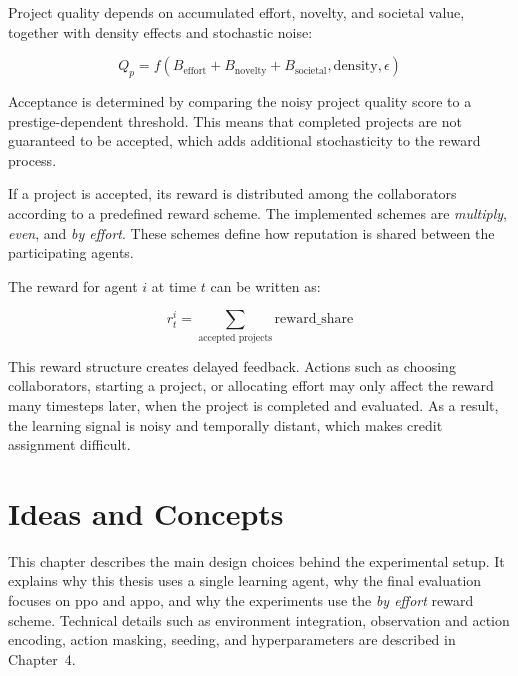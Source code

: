 \documentclass[english,bachelor]{hsluthesis}
\begin{document}
Project quality depends on accumulated effort, novelty, and societal value, together with density effects and stochastic noise:

\begin{equation}
Q_p = f(B_{\text{effort}} + B_{\text{novelty}} + B_{\text{societal}}, \text{density}, \epsilon)
\end{equation}

Acceptance is determined by comparing the noisy project quality score to a prestige-dependent threshold. This means that completed projects are not guaranteed to be accepted, which adds additional stochasticity to the reward process.

If a project is accepted, its reward is distributed among the collaborators according to a predefined reward scheme. The implemented schemes are \textit{multiply}, \textit{even}, and \textit{by effort}. These schemes define how reputation is shared between the participating agents.

The reward for agent $i$ at time $t$ can be written as:

\begin{equation}
r_t^i = \sum_{\text{accepted projects}} \text{reward\_share}
\end{equation}

This reward structure creates delayed feedback. Actions such as choosing collaborators, starting a project, or allocating effort may only affect the reward many timesteps later, when the project is completed and evaluated. As a result, the learning signal is noisy and temporally distant, which makes credit assignment difficult.

\chapter{Ideas and Concepts}

This chapter describes the main design choices behind the experimental setup. It explains why this thesis uses a single learning agent, why the final evaluation focuses on \gls{ppo} and \gls{appo}, and why the experiments use the \textit{by effort} reward scheme. Technical details such as environment integration, observation and action encoding, action masking, seeding, and hyperparameters are described in Chapter~4.
\end{document}

